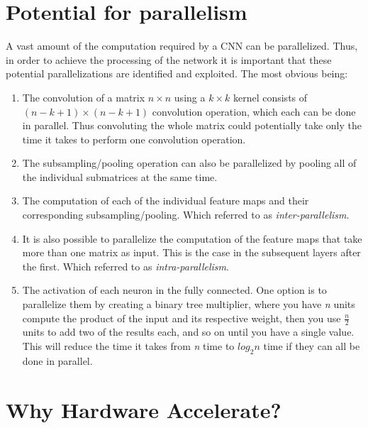 \section{Potential for parallelism} \label{sec_pot_parallelism} 

A vast amount of the computation required by a CNN can be parallelized. Thus, in order to achieve the processing of the network it is important that these potential parallelizations are identified and exploited. The most obvious being:

\begin{enumerate}
    
    \item The convolution of a matrix $ n \times n $ using a $ k \times k $ kernel consists of $ (n - k + 1) \times (n - k + 1) $ convolution operation, which each can be done in parallel. Thus convoluting the whole matrix could potentially take only the time it takes to perform one convolution operation. 
    
    \item The subsampling/pooling operation can also be parallelized by pooling all of the individual submatrices at the same time.  
	
    \item The computation of each of the individual feature maps and their corresponding subsampling/pooling. Which \cite{Chakradhar2010} referred to as \textit{inter-parallelism}.
	
    \item It is also possible to parallelize the computation of the feature maps that take more than one matrix as input. This is the case in the subsequent layers after the first. Which \cite{Chakradhar2010} referred to as \textit{intra-parallelism}.
	
    \item The activation of each neuron in the fully connected. One option is to parallelize them by creating a binary tree multiplier, where you have \textit{n} units compute the product of the input and its respective weight, then you use $ \frac{n}{2} $ units to add two of the results each, and so on until you have a single value. This will reduce the time it takes from \textit{n} time to $ log_2 n $ time if they can all be done in parallel.   
\end{enumerate}

	

\section{Why Hardware Accelerate?}

